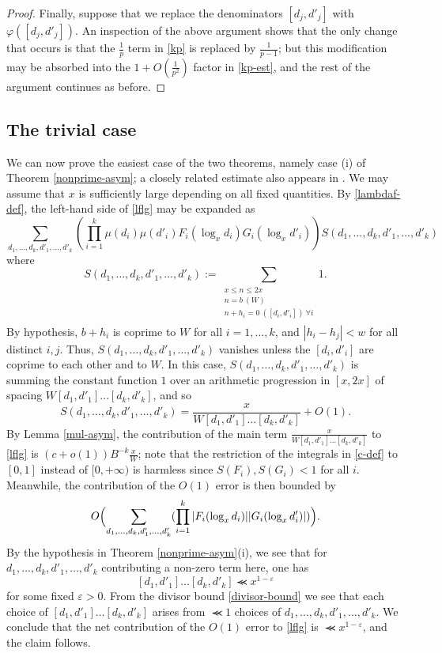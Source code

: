 \documentclass{bmcart}
\theoremstyle{plain}
\theoremstyle{definition}
\newcommand\eps{\varepsilon}
\renewcommand{\lessapprox}{\llcurly}
\renewcommand{\phi}{\varphi}
\begin{document}
\begin{proof}
Finally, suppose that we replace the denominators $[d_j,d'_j]$ with $\phi([d_j,d'_j])$.  An inspection of the above argument shows that the only change that occurs is that the $\frac{1}{p}$ term in \eqref{kp} is replaced by $\frac{1}{p-1}$; but this modification may be absorbed into the $1+O(\frac{1}{p^2})$ factor in \eqref{kp-est}, and the rest of the argument continues as before.
\end{proof}

\subsection{The trivial case}\label{triv-sec}

We can now prove the easiest case of the two theorems, namely case (i) of Theorem \ref{nonprime-asym}; a closely related estimate also appears in \cite[Lemma 6.2]{maynard-new}.  We may assume that $x$ is sufficiently large depending on all fixed quantities. By \eqref{lambdaf-def}, the left-hand side of \eqref{lflg} may be expanded as
\begin{equation}\label{lflg-expand}
 \sum_{d_1,\dots,d_k,d'_1,\dots,d'_k} \left(\prod_{i=1}^k \mu(d_i) \mu(d'_i) F_i(\log_x d_i) G_i(\log_x d'_i)\right) S(d_1,\dots,d_k,d'_1,\dots,d'_k)
\end{equation}
where
$$ S(d_1,\dots,d_k,d'_1,\dots,d'_k) := 
 \sum_{\substack{x \leq n \leq 2x\\ n = b\ (W) \\ n + h_i = 0\ ([d_i,d'_i])\ \forall i\\}} 1.
$$
By hypothesis, $b+h_i$ is coprime to $W$ for all $i=1,\dots,k$, and $|h_i-h_j| < w$ for all distinct $i,j$.  Thus, $S(d_1,\dots,d_k,d'_1,\dots,d'_k)$ vanishes unless the $[d_i,d'_i]$ are coprime to each other and to $W$.  In this case, $S(d_1,\dots,d_k,d'_1,\dots,d'_k)$ is summing the constant function $1$ over an arithmetic progression in $[x,2x]$ of spacing $W [d_1,d'_1] \dots [d_k,d'_k]$, and so  
$$ S(d_1,\dots,d_k,d'_1,\dots,d'_k) = \frac{x}{W [d_1,d'_1] \dots [d_k,d'_k]} + O(1).$$
By Lemma \ref{mul-asym}, the contribution of the main term
$\frac{x}{W [d_1,d'_1] \dots [d_k,d'_k]}$ to \eqref{lflg} is $(c+o(1)) B^{-k} \frac{x}{W}$; note that the restriction of the integrals in \eqref{c-def} to $[0,1]$ instead of $[0,+\infty)$ is harmless since $S(F_i), S(G_i) < 1$ for all $i$.  Meanwhile, the contribution of the $O(1)$ error is then bounded by
$$
O\Bigl( \sum_{d_1,\dots,d_k,d'_1,\dots,d'_k} (\prod_{i=1}^k |F_i(\log_x d_i)| |G_i(\log_x d'_i)|)\Bigr).$$
By the hypothesis in Theorem \ref{nonprime-asym}(i), we see that for $d_1,\dots,d_k,d'_1,\dots,d'_k$ contributing a non-zero term here, one has
$$
[d_1,d'_1] \dots [d_k,d'_k] \lessapprox x^{1-\eps}$$
for some fixed $\eps>0$. From the divisor bound \eqref{divisor-bound} we see that each choice of $[d_1,d'_1] \dots [d_k,d'_k]$ arises from $\lessapprox 1$ choices of $d_1,\dots,d_k,d'_1,\dots,d'_k$.  We conclude that the net contribution of the $O(1)$ error to \eqref{lflg} is $\lessapprox x^{1-\eps}$, and the claim follows.
\end{document}

